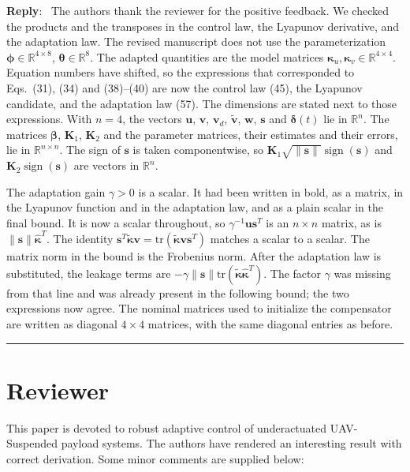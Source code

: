 \documentclass[11pt]{article}
\newcounter{reviewer}
\newcommand{\reviewersection}{\stepcounter{reviewer} \bigskip \hrule
                  \section*{Reviewer \thereviewer}}
\newenvironment{reply}
   {\medskip \noindent \color{blue} \begin{sf}\textbf{Reply}:\  }
   {\medskip \par \end{sf}}
\providecommand{\sign}{\operatorname{sign}}
\begin{document}
\begin{reply}
The authors thank the reviewer for the positive feedback. We checked the products and the transposes in the control law, the Lyapunov derivative, and the adaptation law. The revised manuscript does not use the parameterization $\boldsymbol{\phi}\in\mathbb{R}^{4\times 8}$, $\boldsymbol{\theta}\in\mathbb{R}^{8}$. The adapted quantities are the model matrices $\boldsymbol{\kappa}_u,\boldsymbol{\kappa}_v\in\mathbb{R}^{4\times 4}$. Equation numbers have shifted, so the expressions that corresponded to Eqs.~(31), (34) and (38)--(40) are now the control law  (45), the Lyapunov candidate, and the adaptation law (57).
The dimensions are stated next to those expressions. With $n=4$, the vectors $\mathbf{u}$, $\mathbf{v}$, $\mathbf{v}_d$, $\tilde{\mathbf{v}}$, $\mathbf{w}$, $\mathbf{s}$ and $\boldsymbol{\delta}(t)$ lie in $\mathbb{R}^{n}$. The matrices $\boldsymbol{\beta}$, $\mathbf{K}_1$, $\mathbf{K}_2$ and the parameter matrices, their estimates and their errors, lie in $\mathbb{R}^{n\times n}$. The sign of $\mathbf{s}$ is taken componentwise, so $\mathbf{K}_1\sqrt{\|\mathbf{s}\|}\sign(\mathbf{s})$ and $\mathbf{K}_2\sign(\mathbf{s})$ are vectors in $\mathbb{R}^{n}$.

The adaptation gain $\gamma>0$ is a scalar. It had been written in bold, as a matrix, in the Lyapunov function and in the adaptation law, and as a plain scalar in the final bound. It is now a scalar throughout, so $\gamma^{-1}\mathbf{u}\mathbf{s}^T$ is an $n\times n$ matrix, as is $\|\mathbf{s}\|\hat{\boldsymbol{\kappa}}^T$. The identity $\mathbf{s}^T\boldsymbol{\tilde{\kappa}}\mathbf{v}=\mathrm{tr}(\boldsymbol{\tilde{\kappa}}\mathbf{v}\mathbf{s}^T)$ matches a scalar to a scalar. The matrix norm in the bound is the Frobenius norm. After the adaptation law is substituted, the leakage terms are $-\gamma\|\mathbf{s}\|\mathrm{tr}(\boldsymbol{\tilde{\kappa}}\hat{\boldsymbol{\kappa}}^T)$. The factor $\gamma$ was missing from that line and was already present in the following bound; the two expressions now agree. The nominal matrices used to initialize the compensator are written as diagonal $4\times 4$ matrices, with the same diagonal entries as before.
\end{reply}


\reviewersection

This paper is devoted to robust adaptive control of underactuated UAV-Suspended payload systems. The authors have rendered an interesting result with correct derivation. Some minor comments are supplied below:
\end{document}
